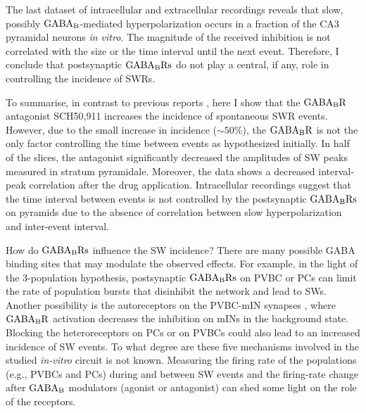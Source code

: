     The last dataset of intracellular and extracellular recordings reveals that
    slow, possibly $\rm GABA_B$-mediated hyperpolarization occurs in a
    fraction of the CA3 pyramidal neurons \textit{in vitro}. The magnitude of
    the received inhibition is not correlated with the size or the time
    interval until the next event. Therefore, I conclude that postsynaptic $\rm
    GABA_BRs$ do not play a central, if any, role in controlling the
    incidence of SWRs.
 
    To summarise, in contrast to previous reports
    \citep[i.e.,][]{Hollnagel2014, Hofer2015}, here I show that the $\rm
    GABA_BR$ antagonist SCH50,911 increases the incidence of spontaneous
    SWR events. However, due to the small increase in incidence
    ($\sim 50\%$), the $\rm GABA_BR$ is not the only factor controlling the
    time between events as hypothesized initially. In half of the slices, the
    antagonist significantly decreased the amplitudes of SW peaks measured in
    stratum pyramidale. Moreover, the data shows a decreased interval-peak
    correlation after the drug application. Intracellular recordings suggest
    that the time interval between events is not controlled by the postsynaptic
    $\rm GABA_B Rs$ on pyramids due to the absence of correlation between slow
    hyperpolarization and inter-event interval.

    How do $\rm GABA_B Rs$ influence the SW incidence? There are many
    possible GABA binding sites that may modulate the observed effects. For
    example, in the light of the 3-population hypothesis, postsynaptic $\rm
    GABA_B Rs$ on PVBC \citep{Booker2013} or PCs \citep{Kulik2006, Degro2015}
    can limit the rate of population bursts that disinhibit the network and lead to
    SWs. Another possibility is the autoreceptors on the PVBC-mIN synapses
    \citep{Lei2003, Booker2013}, where $\rm GABA_BR$ activation decreases the
    inhibition on mINs in the background state. Blocking the heteroreceptors on
    PCs \citep{Lei2003, Lopez2004, Kulik2006} or on PVBCs \citep{Lei2003} could
    also lead to an increased incidence of SW events. To what degree are these
    five mechanisms involved in the studied \textit{in-vitro} circuit is not
    known. Measuring the firing rate of the populations (e.g., PVBCs and PCs)
    during and between SW events and the firing-rate change after $\rm GABA_B$
    modulators (agonist or antagonist) can shed some light on the role of the
    receptors.


